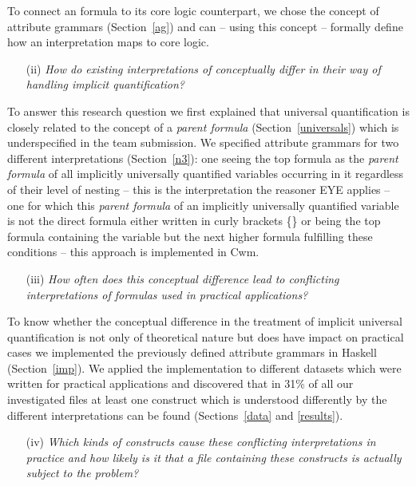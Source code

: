 To connect an \nthree formula to its core logic counterpart, we chose the concept of attribute grammars (Section~\ref{ag}) and can -- using this concept -- formally
define how an interpretation maps \nthree to core logic.
 \begin{enumerate}
 \item[(ii)] \emph{How do existing interpretations of \nthreelogic conceptually differ in their way of handling implicit quantification?}
\end{enumerate}
To answer this research question we first explained that universal quantification is closely related to the concept of a \emph{parent formula} 
(Section~\ref{universals}) which is underspecified in the \wwwc team submission. 
We specified attribute grammars for two different interpretations (Section~\ref{n3}): one seeing the top formula as the \emph{parent formula} of all implicitly universally
quantified variables occurring in it regardless of their level of nesting -- this is the interpretation the reasoner EYE applies -- 
one for which this \emph{parent formula} of an implicitly universally quantified variable is not the direct formula either written in curly brackets \{\} 
or being the top formula
containing the variable
but the next higher formula fulfilling these conditions -- this approach is implemented in Cwm.
\begin{enumerate}
 \item[(iii)] \textit{How often does this conceptual difference lead to conflicting interpretations of formulas used in practical applications?}
 \end{enumerate}
To know whether the conceptual difference in the treatment of implicit universal quantification is not only of theoretical nature but does have impact 
on practical cases we implemented the previously defined attribute grammars in Haskell (Section~\ref{imp}). We applied the implementation to different datasets which were written for 
practical applications and discovered that in 31\% of
all our investigated files at least one construct which is understood differently by the different interpretations can be found (Sections~\ref{data} and \ref{results}).
 \begin{enumerate}
 \item[(iv)]\textit{Which kinds of constructs cause these conflicting interpretations in practice and how likely is it that a file containing 
 these constructs is actually 
 subject to the problem?}
\end{enumerate}
